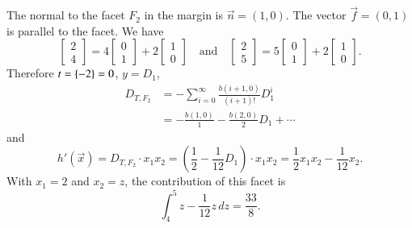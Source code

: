 \begin{example}
%
The normal to the facet $F_2$ in the margin is $\vec n = (1,0)$.
The vector $\vec f = (0,1)$ is parallel to the facet.
We have
$$
\begin{bmatrix}
2 \\ 4
\end{bmatrix}
=
4
\begin{bmatrix}
0 \\ 1
\end{bmatrix}
+2
\begin{bmatrix}
1 \\ 0
\end{bmatrix}
\quad\text{and}\quad
\begin{bmatrix}
2 \\ 5
\end{bmatrix}
=
5
\begin{bmatrix}
0 \\ 1
\end{bmatrix}
+2
\begin{bmatrix}
1 \\ 0
\end{bmatrix}
.
$$
Therefore $t = \left\{-2\right\} = 0$, $y = D_1$,
\begin{align*}
D_{T,F_2}
& = 
- \sum_{i=0}^\infty \frac{b(i+1, 0)}{(i+1)!} D_1^i
\\
& =
- \frac{b(1,0)}1 - \frac{b(2,0)}2 D_1 + \cdots
\end{align*}
and
$$
h'(\vec x) =
D_{T,F_2} \cdot x_1 x_2 =
\left(\frac 1 2 - \frac 1{12} D_1\right) \cdot x_1 x_2
=
\frac 1 2 x_1 x_2 - \frac 1{12} x_2
.
$$
With $x_1 = 2$ and $x_2 = z$, the contribution of this facet
is
$$
\int_{4}^{5} z - \frac 1{12} z \, dz
=
\frac{33}{8}
.
$$


\end{example}
